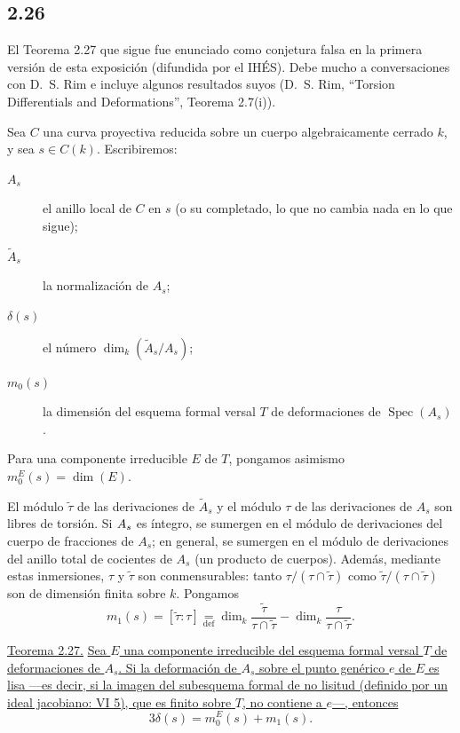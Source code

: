 \subsection*{2.26}
El Teorema 2.27 que sigue fue enunciado como conjetura falsa en la primera
versión de esta exposición (difundida por el IHÉS). Debe mucho a conversaciones con
D.~S. Rim e incluye algunos resultados suyos (D.~S. Rim, ``Torsion
Differentials and Deformations'', Teorema 2.7(i)).

\pageoriginale

Sea $C$ una curva proyectiva reducida sobre un cuerpo algebraicamente cerrado
$k$, y sea $s\in C(k)$. Escribiremos:
\begin{description}
\item[$A_s$] el anillo local de $C$ en $s$ (o su completado, lo que no cambia
nada en lo que sigue);
\item[$\widetilde A_s$] la normalización de $A_s$;
\item[$\delta(s)$] el número $\dim_k(\widetilde A_s/A_s)$;
\item[$m_0(s)$] la dimensión del esquema formal versal $T$ de deformaciones de
$\operatorname{Spec}(A_s)$.
\end{description}

Para una componente irreducible $E$ de $T$, pongamos asimismo
$m_0^E(s)=\dim(E)$.

El módulo $\widetilde\tau$ de las derivaciones de $\widetilde A_s$ y el módulo
$\tau$ de las derivaciones de $A_s$ son libres de torsión. Si
$\sisi{A}{A_s}$ es íntegro, se sumergen en el módulo de derivaciones del cuerpo
de fracciones de $A_s$; en general, se sumergen en el módulo de derivaciones del
anillo total de cocientes de $A_s$ (un producto de cuerpos). Además, mediante
estas inmersiones, $\tau$ y $\widetilde\tau$ son conmensurables: tanto
$\tau/(\tau\cap\widetilde\tau)$ como
$\widetilde\tau/(\tau\cap\widetilde\tau)$ son de dimensión finita sobre $k$.
Pongamos
\begin{equation*}
m_1(s)=[\widetilde\tau:\tau]
\mathrel{\mathop=\limits_{\mathrm{def}}}
\dim_k\frac{\widetilde\tau}{\tau\cap\widetilde\tau}
-\dim_k\frac{\tau}{\tau\cap\widetilde\tau}.
\end{equation*}

\medskip
\noindent\underline{Teorema 2.27.}
\underline{Sea $E$ una componente irreducible del esquema formal versal $T$ de
deformaciones de $A_s$. Si la deformación de $A_s$ sobre el punto genérico $e$
de $E$ es lisa ---es decir, si la imagen del subesquema formal de no lisitud
(definido por un ideal jacobiano: VI 5), que es finito sobre $T$, no contiene a
$e$---, entonces}
\begin{equation*}
3\delta(s)=m_0^E(s)+m_1(s).
\end{equation*}

